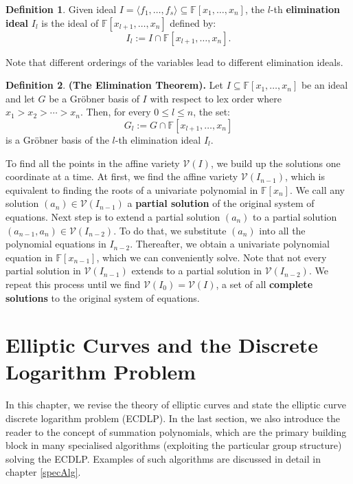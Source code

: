 \documentclass[thesis=M,english]{FITthesis}[2012/10/20]
\theoremstyle{remark}
\theoremstyle{definition}
\newtheorem{DF}{Definition}[section]
\begin{document}
\begin{DF}
Given ideal $I = \langle f_1,\ldots,f_s\rangle \subseteq \mathbb{F}[x_1,\ldots,x_n]$, the $l$-th \textbf{elimination ideal} $I_l$ is the ideal of $\mathbb{F}[x_{l+1},\ldots,x_n]$ defined by:
$$
I_l := I \cap \mathbb{F}[x_{l+1},\ldots,x_n].
$$
\end{DF}
\noindent Note that different orderings of the variables lead to different elimination ideals.
\begin{DF}
\textbf{(The Elimination Theorem).} Let $I \subseteq \mathbb{F}[x_1,\ldots,x_n]$ be an ideal and let $G$ be a Gröbner basis of $I$ with respect to lex order where $x_1 > x_2 > \cdots > x_n$. Then, for every $0\leq l \leq n$, the set:
$$
G_l := G \cap \mathbb{F}[x_{l+1},\ldots,x_n]
$$
is a Gröbner basis of the $l$-th elimination ideal $I_l$.
\end{DF}
\vphantom{.}
\noindent To find all the points in the affine variety $\mathcal{V}(I)$, we build up the solutions one coordinate at a time. At first, we find the affine variety $\mathcal{V}(I_{n-1})$, which is equivalent to finding the roots of a univariate polynomial in $\mathbb{F}[x_n]$. We call any solution $(a_n) \in \mathcal{V}(I_{n-1})$ a \textbf{partial solution} of the original system of equations. Next step is to extend a partial solution $(a_n)$ to a partial solution $(a_{n-1},a_n) \in \mathcal{V}(I_{n-2})$. To do that, we substitute $(a_n)$ into all the polynomial equations in $I_{n-2}$. Thereafter, we obtain a univariate polynomial equation in $\mathbb{F}[x_{n-1}]$, which we can conveniently solve. Note that not every partial solution in $\mathcal{V}(I_{n-1})$ extends to a partial solution in $\mathcal{V}(I_{n-2})$. We repeat this process until we find $\mathcal{V}(I_0) = \mathcal{V}(I)$, a set of all \textbf{complete solutions} to the original system of equations.
%
%
\chapter{Elliptic Curves and the Discrete Logarithm Problem}
In this chapter, we revise the theory of elliptic curves and state the elliptic curve discrete logarithm problem (ECDLP). In the last section, we also introduce the reader to the concept of summation polynomials, which are the primary building block in many specialised algorithms (exploiting the particular group structure) solving the ECDLP. Examples of such algorithms are discussed in detail in chapter \ref{specAlg}.
\end{document}
